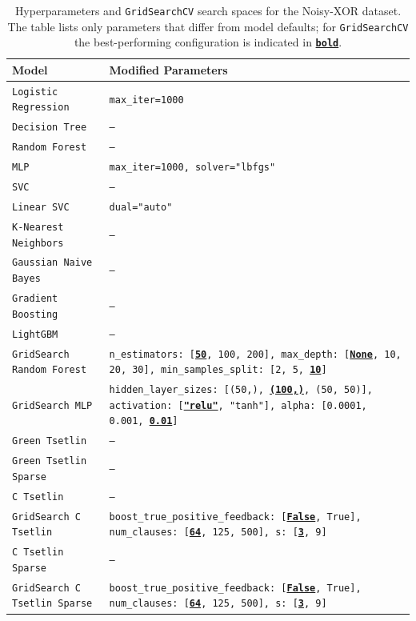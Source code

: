 \begin{table}[!htbp]
\centering
\caption[Noisy-XOR hyperparameters]{Hyperparameters and \texttt{GridSearchCV} search spaces for the Noisy-XOR dataset. The table lists only parameters that differ from model defaults; for \texttt{GridSearchCV} the best-performing configuration is indicated in \texttt{\textbf{\underline{bold}}}\label{tab:noisy-xor-params}.}
\begin{tabularx}{\textwidth}{@{}l L@{}} \toprule
    \textbf{Model} & \textbf{Modified Parameters} \\ \midrule \midrule
    \texttt{Logistic Regression} & \texttt{max\_iter=1000} \\ \midrule
    \texttt{Decision Tree} & \texttt{---} \\ \midrule
    \texttt{Random Forest} & \texttt{---} \\ \midrule
    \texttt{MLP} & \texttt{max\_iter=1000, solver="lbfgs"} \\ \midrule
    \texttt{SVC} & \texttt{---} \\ \midrule
    \texttt{Linear SVC} & \texttt{dual="auto"} \\ \midrule
    \texttt{K-Nearest Neighbors} & \texttt{---} \\ \midrule
    \texttt{Gaussian Naive Bayes} & \texttt{---} \\ \midrule
    \texttt{Gradient Boosting} & \texttt{---} \\ \midrule
    \texttt{LightGBM} & \texttt{---} \\ \midrule
    \texttt{GridSearch Random Forest} & \texttt{n\_estimators: [\textbf{\underline{50}}, 100, 200], max\_depth: [\textbf{\underline{None}}, 10, 20, 30], min\_samples\_split: [2, 5, \textbf{\underline{10}}]} \\ \midrule
    \texttt{GridSearch MLP} & \texttt{hidden\_layer\_sizes: [(50,), \textbf{\underline{(100,)}}, (50, 50)], activation: [\textbf{\underline{"relu"}}, "tanh"], alpha: [0.0001, 0.001, \textbf{\underline{0.01}}]} \\ \midrule \midrule
    \texttt{Green Tsetlin} & \texttt{---} \\ \midrule
    \texttt{Green Tsetlin Sparse} & \texttt{---} \\ \midrule
    \texttt{C Tsetlin} & \texttt{---} \\ \midrule
    \texttt{GridSearch C Tsetlin} & \texttt{boost\_true\_positive\_feedback: [\textbf{\underline{False}}, True], num\_clauses: [\textbf{\underline{64}}, 125, 500], s: [\textbf{\underline{3}}, 9]} \\ \midrule
    \texttt{C Tsetlin Sparse} & \texttt{---} \\ \midrule
    \texttt{GridSearch C Tsetlin Sparse} & \texttt{boost\_true\_positive\_feedback: [\textbf{\underline{False}}, True], num\_clauses: [\textbf{\underline{64}}, 125, 500], s: [\textbf{\underline{3}}, 9]} \\ \bottomrule
\end{tabularx}
\end{table}

